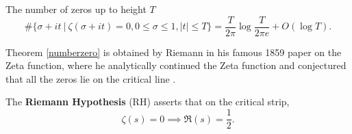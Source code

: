 \begin{theorem} \label{numberzero}
	The number of zeros up to height $T$\[
	\#\{\sigma+it \ | \ \zeta(\sigma+it)=0,0 \leq \sigma\leq 1, |t|\leq T \} = \frac{T}{2\pi}\log{\frac{T}{2\pi e}} + O(\log T).
	\]
\end{theorem}
Theorem \ref{numberzero} is obtained by Riemann in his famous 1859 paper on the Zeta function, where he analytically continued the Zeta function and conjectured that all the zeros lie on the critical line \cite{Riemann1859}.
\begin{conjecture} \label{RH}
	The \textbf{Riemann Hypothesis} (RH) asserts that on the critical strip, \[
	\zeta(s) = 0 \implies \Re(s) = \frac{1}{2}. 
	\]
\end{conjecture}
